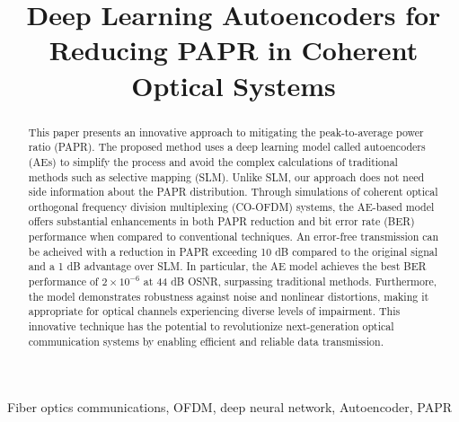\documentclass[conference]{IEEEtran}
\begin{document}
\title{Deep Learning Autoencoders for Reducing PAPR in Coherent Optical Systems}

\author{
}

\maketitle

\begin{abstract}
This paper presents an innovative approach to mitigating the peak-to-average power ratio (PAPR). The proposed method uses a deep learning model called autoencoders (AEs) to simplify the process and avoid the complex calculations of traditional methods such as selective mapping (SLM). Unlike SLM, our approach does not need side information about the PAPR distribution. Through simulations of coherent optical orthogonal frequency division multiplexing (CO-OFDM) systems, the AE-based model offers substantial enhancements in both PAPR reduction and bit error rate (BER) performance when compared to conventional techniques. An error-free transmission can be acheived with a reduction in PAPR exceeding 10 dB compared to the original signal and a 1 dB advantage over SLM. In particular, the AE model achieves the best BER performance of $2 \times 10^{-6}$ at 44 dB OSNR, surpassing traditional methods. Furthermore, the model demonstrates robustness against noise and nonlinear distortions, making it appropriate for optical channels experiencing diverse levels of impairment. This innovative technique has the potential to revolutionize next-generation optical communication systems by enabling efficient and reliable data transmission.
\end{abstract}

\begin{IEEEkeywords}
Fiber optics communications, OFDM, deep neural network, Autoencoder, PAPR
\end{IEEEkeywords}
\end{document}
